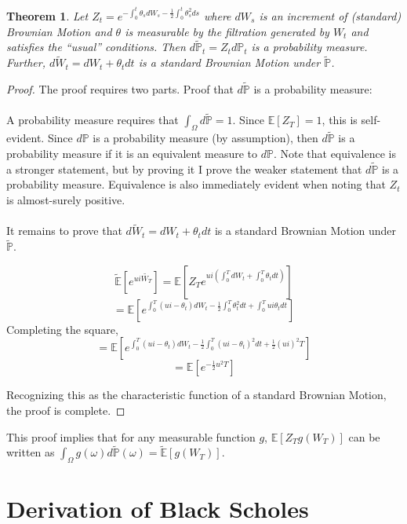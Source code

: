 \documentclass{article}
\newtheorem{theorem}{Theorem}
\begin{document}
\begin{theorem}
	Let \( Z_t=e^{-\int_0 ^t \theta_s dW_s-\frac{1}{2} \int_0 ^ t \theta^2 _s ds} \) where \(dW_s\) is an increment of (standard) Brownian Motion and \(\theta\) is measurable by the filtration generated by \(W_t\) and satisfies the ``usual'' conditions.  Then \(d\mathbb{\tilde{P}}_t=Z_t d\mathbb{P}_t\) is a probability measure. Further, \(d\tilde{W}_t=dW_t+\theta_t dt\) is a standard Brownian Motion under \(\mathbb{\tilde{P}}\).
\end{theorem}
\begin{proof}
The proof requires two parts.  Proof that \( d \mathbb{ \tilde{P} } \) is a probability measure:
\\
\\
A probability measure requires that \( \int_\Omega d \mathbb{ \tilde{P} }=1\).  Since \( \mathbb{E}[Z_T]=1\), this is self-evident.  Since \(d\mathbb{P}\) is a probability measure (by assumption), then \(d\mathbb{\tilde{P}}\) is a probability measure if it is an equivalent measure to \(d\mathbb{P}\).  Note that equivalence is a stronger statement, but by proving it I prove the weaker statement that \(d \mathbb{\tilde{P}}\) is a probability measure.  Equivalence is also immediately evident when noting that \(Z_t\) is almost-surely positive.  
\\
\\
It remains to prove that \(d\tilde{W}_t=dW_t+\theta_t dt\) is a standard Brownian Motion under \(\mathbb{\tilde{P}}\).

\[\mathbb{\tilde{E}}\left[e^{ui\tilde{W_T}}\right]=\mathbb{E}\left[Z_Te^{ui \left(\int_0 ^ T dW_t+\int_0^T \theta_t dt\right)}\right]\]
\[=\mathbb{E}\left[e^{\int_0 ^T (ui-\theta_t)dW_t-\frac{1}{2}\int_0^T \theta^2_t dt + \int_0^T ui\theta_t dt}\right]\]
Completing the square, 
\[=\mathbb{E}\left[e^{\int_0 ^T (ui-\theta_t)dW_t-\frac{1}{2}\int_0^T  (ui-\theta_t)^2 dt + \frac{1}{2} (ui)^2 T } \right]\]
\[=\mathbb{E}\left[ e^{ -\frac{1}{2} u^2 T } \right]\]

Recognizing this as the characteristic function of a standard Brownian Motion, the proof is complete.
\end{proof}

This proof implies that for any measurable function \(g\), \(\mathbb{E}[Z_T g(W_T)]\) can be written as \(\int_\Omega g(\omega) d\mathbb{\tilde{P}}(\omega)=\mathbb{\tilde{E}}[g(W_T)]\). 

\section{Derivation of Black Scholes}
\end{document}
